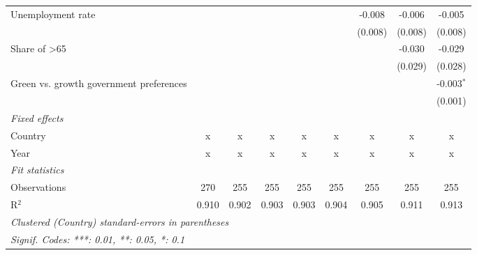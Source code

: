 \begin{table}[htbp]
\begin{tabular}{lcccccccc}
      Unemployment rate                                           &         &         &         &         &         & -0.008  & -0.006  & -0.005\\   
                                                                  &         &         &         &         &         & (0.008) & (0.008) & (0.008)\\   
      Share of >65                                                &         &         &         &         &         &         & -0.030  & -0.029\\   
                                                                  &         &         &         &         &         &         & (0.029) & (0.028)\\   
      Green vs. growth government preferences                     &         &         &         &         &         &         &         & -0.003$^{*}$\\   
                                                                  &         &         &         &         &         &         &         & (0.001)\\   
      \emph{Fixed effects}\\
      Country                                                     & x       & x       & x       & x       & x       & x       & x       & x\\  
      Year                                                        & x       & x       & x       & x       & x       & x       & x       & x\\  
      \midrule \emph{Fit statistics}\\
      Observations                                                & 270     & 255     & 255     & 255     & 255     & 255     & 255     & 255\\  
      R$^2$                                                       & 0.910   & 0.902   & 0.903   & 0.903   & 0.904   & 0.905   & 0.911   & 0.913\\  
      \midrule
      \multicolumn{9}{l}{\emph{Clustered (Country) standard-errors in parentheses}}\\
      \multicolumn{9}{l}{\emph{Signif. Codes: ***: 0.01, **: 0.05, *: 0.1}}\\
   \end{tabular}
\end{table}


